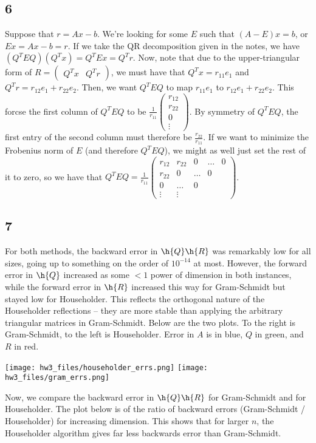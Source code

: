 \documentclass{article}
\newcommand{\openm}{\begin{pmatrix}}
\newcommand{\closem}{\end{pmatrix}}
\begin{document}
\subsection*{6}
Suppose that $r=Ax-b$. We're looking for some $E$ such that $(A-E)x=b$, or $Ex=Ax-b=r$. If we take the QR decomposition given in the notes, we have $(Q^TEQ)(Q^Tx)=Q^TEx=Q^Tr$. Now, note that due to the upper-triangular form of $R=\openm Q^Tx&Q^Tr\closem$, we must have that $Q^Tx=r_{11}e_1$ and $Q^Tr=r_{12}e_1+r_{22}e_2$. Then, we want $Q^TEQ$ to map $r_{11}e_1$ to $r_{12}e_1+r_{22}e_2$. This forcse the first column of $Q^TEQ$ to be $\frac{1}{r_{11}}\openm r_{12}\\r_{22}\\0\\\vdots\closem$. By symmetry of $Q^TEQ$, the first entry of the second column must therefore be $\frac{r_{22}}{r_{11}}$. If we want to minimize the Frobenius norm of $E$ (and therefore $Q^TEQ$), we might as well just set the rest of it to zero, so we have that $Q^TEQ=\frac{1}{r_{11}}\openm r_{12}&r_{22}&0&\hdots&0\\r_{22}&0&\hdots&0\\0&\hdots&0\\\vdots&\vdots\closem$.
\subsection*{7}
For both methods, the backward error in $\h{Q}\h{R}$ was remarkably low for all sizes, going up to something on the order of $10^{-14}$ at most. However, the forward error in $\h{Q}$ increased as some $<1$ power of dimension in both instances, while the forward error in $\h{R}$ increased this way for Gram-Schmidt but stayed low for Householder. This reflects the orthogonal nature of the Householder reflections -- they are more stable than applying the arbitrary triangular matrices in Gram-Schmidt. Below are the two plots. To the right is Gram-Schmidt, to the left is Householder. Error in $A$ is in blue, $Q$ in green, and $R$ in red.

\texttt{[image: hw3\_files/householder\_errs.png]}
\texttt{[image: hw3\_files/gram\_errs.png]}

Now, we compare the backward error in $\h{Q}\h{R}$ for Gram-Schmidt and for Householder. The plot below is of the ratio of backward errors (Gram-Schmidt / Householder) for increasing dimension. This shows that for larger $n$, the Householder algorithm gives far less backwards error than Gram-Schmidt.
\end{document}
